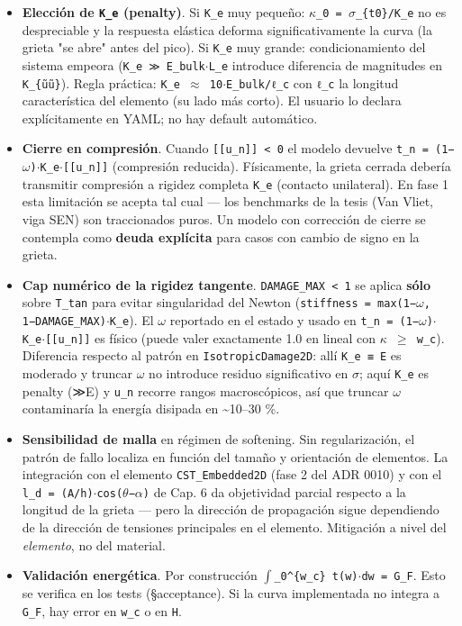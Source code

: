 \documentclass[11pt,letterpaper,oneside]{report}
\begin{document}
\begin{itemize}
  \item \textbf{Elección de \texttt{K\_e} (penalty)}. Si \texttt{K\_e} muy pequeño: \texttt{\ensuremath{\kappa}\_0 = \ensuremath{\sigma}\_\{t0\}/K\_e} no es despreciable y la respuesta elástica deforma significativamente la curva (la grieta "se abre" antes del pico). Si \texttt{K\_e} muy grande: condicionamiento del sistema empeora (\texttt{K\_e ≫ E\_bulk\ensuremath{\cdot}L\_e} introduce diferencia de magnitudes en \texttt{K\_\{ũũ\}}). Regla práctica: \texttt{K\_e \ensuremath{\approx} 10\ensuremath{\cdot}E\_bulk/ℓ\_c} con \texttt{ℓ\_c} la longitud característica del elemento (su lado más corto). El usuario lo declara explícitamente en YAML; no hay default automático.
  \item \textbf{Cierre en compresión}. Cuando \texttt{[[u\_n]] < 0} el modelo devuelve \texttt{t\_n = (1−\ensuremath{\omega})\ensuremath{\cdot}K\_e\ensuremath{\cdot}[[u\_n]]} (compresión reducida). Físicamente, la grieta cerrada debería transmitir compresión a rigidez completa \texttt{K\_e} (contacto unilateral). En fase 1 esta limitación se acepta tal cual --- los benchmarks de la tesis (Van Vliet, viga SEN) son traccionados puros. Un modelo con corrección de cierre se contempla como \textbf{deuda explícita} para casos con cambio de signo en la grieta.
  \item \textbf{Cap numérico de la rigidez tangente}. \texttt{DAMAGE\_MAX < 1} se aplica \textbf{sólo} sobre \texttt{T\_tan} para evitar singularidad del Newton (\texttt{stiffness = max(1−\ensuremath{\omega}, 1−DAMAGE\_MAX)\ensuremath{\cdot}K\_e}). El \texttt{\ensuremath{\omega}} reportado en el estado y usado en \texttt{t\_n = (1−\ensuremath{\omega})\ensuremath{\cdot}K\_e\ensuremath{\cdot}[[u\_n]]} es físico (puede valer exactamente 1.0 en lineal con \texttt{\ensuremath{\kappa} \ensuremath{\ge} w\_c}). Diferencia respecto al patrón en \texttt{IsotropicDamage2D}: allí \texttt{K\_e ≡ E} es moderado y truncar \ensuremath{\omega} no introduce residuo significativo en \ensuremath{\sigma}; aquí \texttt{K\_e} es penalty (≫E) y \texttt{u\_n} recorre rangos macroscópicos, así que truncar \ensuremath{\omega} contaminaría la energía disipada en \textasciitilde{}10--30 \%.
  \item \textbf{Sensibilidad de malla} en régimen de softening. Sin regularización, el patrón de fallo localiza en función del tamaño y orientación de elementos. La integración con el elemento \texttt{CST\_Embedded2D} (fase 2 del ADR 0010) y con el \texttt{l\_d = (A/h)\ensuremath{\cdot}cos(\ensuremath{\theta}−\ensuremath{\alpha})} de Cap. 6 da objetividad parcial respecto a la longitud de la grieta --- pero la dirección de propagación sigue dependiendo de la dirección de tensiones principales en el elemento. Mitigación a nivel del \textit{elemento}, no del material.
  \item \textbf{Validación energética}. Por construcción \texttt{\ensuremath{\int}\_0\textasciicircum{}\{w\_c\} t(w)\ensuremath{\cdot}dw = G\_F}. Esto se verifica en los tests (§acceptance). Si la curva implementada no integra a \texttt{G\_F}, hay error en \texttt{w\_c} o en \texttt{H}.
\end{itemize}
\end{document}
